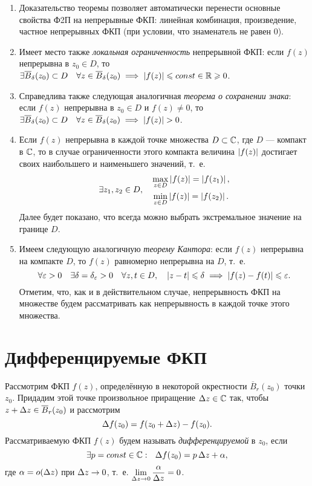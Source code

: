 \documentclass[../../main.tex]{subfiles}
\begin{document}
\begin{rems}
	\;
	
	\begin{enumerate}
		\item Доказательство теоремы позволяет автоматически
		перенести основные свойства Ф2П на непрерывные ФКП:
		линейная комбинация, произведение, частное непрерывных ФКП (при условии, 
		что знаменатель не равен $0$).
		\item Имеет место также \emph{локальная ограниченность} непрерывной ФКП:
		если $f(z)$ непрерывна в $z_0 \in D$, то
		$\exists \overline{B}_{\delta} (z_0) \subset D \quad
		\forall z \in \overline{B}_{\delta} (z_0) \implies
		\left|{f(z)}\right| \leqslant const \in \mathbb{R} \geqslant 0$.
		\item Справедлива также следующая аналогичная
		\emph{теорема о сохранении знака}:
		если $f(z)$ непрерывна в $z_0 \in D$ и $f(z) \ne 0$, то
		$\exists \overline{B}_{\delta} (z_0) \subset D
		\quad \forall z \in \overline{B}_{\delta} (z_0) \implies \left|{f(z)}\right| > 0$.
		\item Если $f(z)$ непрерывна в каждой точке множества $D \subset \mathbb{C}$,
		где $D$ --- компакт в $\mathbb{C}$, то в случае ограниченности этого компакта
		величина $\left|{f(z)}\right|$ достигает своих наибольшего и наименьшего значений,
		т.~е.
		\[
		\exists z_1, z_2 \in D, \quad
		\begin{gathered}
			\max\limits_{z \in D} \left|{f(z)}\right| = \left|{f(z_1)}\right|, \\
			\min\limits_{z \in D} \left|{f(z)}\right| = \left|{f(z_2)}\right|.
		\end{gathered}
		\]
		Далее будет показано, что всегда можно выбрать экстремальное значение
		на границе $D$.
		\item Имеем следующую аналогичную \emph{теорему Кантора}:
		если $f(z)$ непрерывна на компакте $D$,
		то $f(z)$ равномерно непрерывна на $D$, т.~е.
		\[
		\forall \varepsilon > 0 \quad \exists \delta = \delta_{\varepsilon} > 0 \quad
		\forall z, t \in D, \quad \left|{z - t}\right| \leqslant \delta
		\implies \left|{f(z) - f(t)}\right| \leqslant \varepsilon.
		\]
		Отметим, что, как и в действительном случае, непрерывность ФКП на множестве
		будем рассматривать как непрерывность в каждой точке этого множества.
	\end{enumerate}
\end{rems}

\section{Дифференцируемые ФКП}

Рассмотрим ФКП $f(z)$, определённую в некоторой окрестности
$\overline{B}_r (z_0)$ точки $z_0$. Придадим этой точке произвольное 
приращение $\Delta z \in \mathbb{C}$ так,
чтобы $z + \Delta z \in \overline{B}_r (z_0)$ и рассмотрим
\begin{equation}
\label{lec28:3}
\Delta f(z_0) = f(z_0 + \Delta z) - f(z_0).
\end{equation}
Рассматриваемую ФКП $f(z)$ будем называть \emph{дифференцируемой} в $z_0$,
если
\begin{equation}
\label{lec28:4}
\exists p = const \in \mathbb{C} : \ \
\Delta f(z_0) = p\, \Delta z + \alpha,
\end{equation}
где $\alpha = o(\Delta z)$ при $\Delta z \to 0$,
т.~е. $\lim\limits_{\Delta z \to 0} \dfrac{\alpha}{\Delta z} = 0$.
\end{document}
